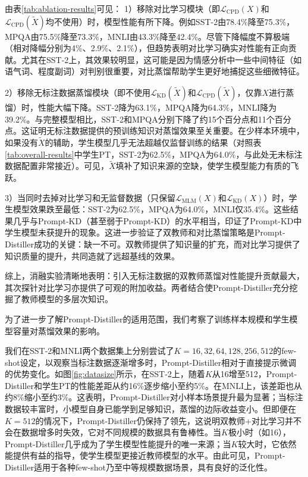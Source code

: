\documentclass[../main.tex]{subfiles}
\begin{document}
由表\ref{tab:ablation-results}可见：
1）移除对比学习模块（即$\mathcal{L}_{\text{CPD}}(X)$和$\mathcal{L}_{\text{CPD}}(\tilde{X})$均不使用）时，模型性能有所下降。例如SST-2由78.4\%降至75.3\%，MPQA由75.5\%降至73.3\%，MNLI由43.3\%降至42.4\%。尽管下降幅度不算极端（相对降幅分别为4\%、2.9\%、2.1\%），但趋势表明对比学习确实对性能有正向贡献。尤其在SST-2上，其效果较明显，这可能是因为情感分析中一些中间特征（如语气词、程度副词）对判别很重要，对比蒸馏帮助学生更好地捕捉这些细微特征。

2）移除无标注数据蒸馏模块（即不使用$\mathcal{L}_{\text{KD}}(\tilde{X})$和$\mathcal{L}_{\text{CPD}}(\tilde{X})$，仅靠$X$进行蒸馏）时，性能大幅下降。SST-2降为63.1\%，MPQA降为64.3\%，MNLI降为39.2\%。与完整模型相比，SST-2和MPQA分别下降了约15个百分点和11个百分点。这证明无标注数据提供的预训练知识对蒸馏效果至关重要。在少样本环境中，如果没有$\tilde{X}$的辅助，学生模型几乎无法超越仅监督训练的结果（对照表\ref{tab:overall-results}中学生PT，SST-2为62.5\%，MPQA为64.0\%，与此处无未标注数据配置非常接近）。可见，$\tilde{X}$填补了知识来源的空缺，使学生模型能力有质的飞跃。

3）当同时去掉对比学习和无监督数据（只保留$\mathcal{L}_{\text{MLM}}(X)$和$\mathcal{L}_{\text{KD}}(X)$）时，学生模型效果跌至最低：SST-2为62.5\%，MPQA为64.0\%，MNLI仅35.4\%。这些结果几乎与Prompt-KD（甚至弱于Prompt-KD）的水平相当，印证了Prompt-KD中学生模型未获提升的现象。这进一步验证了双教师和对比蒸馏策略是Prompt-Distiller成功的关键：缺一不可。双教师提供了知识量的扩充，而对比学习提供了知识质量的提升，共同造就了远超基线的效果。

综上，消融实验清晰地表明：引入无标注数据的双教师蒸馏对性能提升贡献最大，其次探针对比学习亦提供了可观的附加收益。两者结合使Prompt-Distiller充分挖掘了教师模型的多层次知识。

\label{sec:ch3-5-4-sample-and-model-scale-analysis}
为了进一步了解Prompt-Distiller的适用范围，我们考察了训练样本规模和学生模型容量对蒸馏效果的影响。


我们在SST-2和MNLI两个数据集上分别尝试了$K=16, 32, 64, 128, 256, 512$的few-shot设定，以观察当标注数据逐渐增多时，Prompt-Distiller相对于直接提示微调的优势变化。如图\ref{fig:datasize}所示，在SST-2上，随着$K$从16增至512，Prompt-Distiller和学生PT的性能差距从约16\%逐步缩小至约5\%。在MNLI上，该差距也从约8\%缩小至约3\%。这表明，Prompt-Distiller对小样本场景提升最为显著；当标注数据较丰富时，小模型自身已能学到足够知识，蒸馏的边际收益变小。但即便在$K=512$的情况下，Prompt-Distiller仍保持了领先，这说明双教师+对比学习并不会在数据增多时失效，它对不同规模的数据具有鲁棒性。当$K$极小时（如16），Prompt-Distiller几乎成为了学生模型性能提升的唯一来源；当$K$较大时，它依然能提供有益的指导，使学生模型更接近教师模型的水平。由此可见，Prompt-Distiller适用于各种few-shot乃至中等规模数据场景，具有良好的泛化性。
\end{document}
